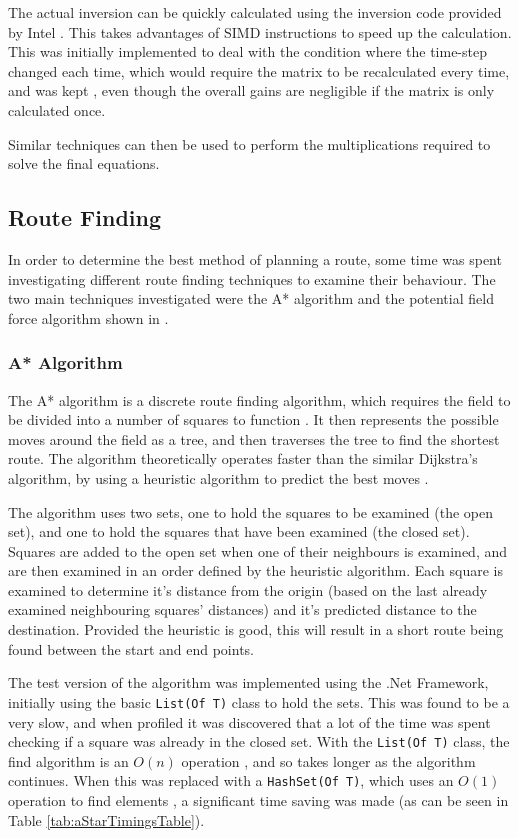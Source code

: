 \documentclass[10pt]{article}
\begin{document}
The actual inversion can be quickly calculated using the inversion code provided
by Intel \cite{intelMatrixInverse}.  This takes advantages of SIMD
instructions to speed up the calculation.  This was initially implemented to
deal with the condition where the time-step changed each time, which would
require the matrix to be recalculated every time, and was kept , even though the
overall gains are negligible if the matrix is only calculated once.

Similar techniques can then be used to perform the multiplications required to
solve the final equations.

\subsection{Route Finding}
In order to determine the best method of planning a route, some time was spent
investigating different route finding techniques to examine their behaviour. 
The two main techniques investigated were the A* algorithm and the potential
field force algorithm shown in \cite{intelligentAlgorithmPathPlanning}.

\subsubsection{A* Algorithm}

The A* algorithm is a discrete route finding algorithm, which requires the field
to be divided into a number of squares to function \cite{aiModernApproach}.  It
then represents the possible moves around the field as a tree, and then
traverses the tree to find the shortest route.  The algorithm theoretically
operates faster than the similar Dijkstra's algorithm, by using a heuristic
algorithm to predict the best moves \cite{wikipediaAStar}.

The algorithm uses two sets, one to hold the squares to be examined (the open
set), and one to hold the squares that have been examined (the closed set).
Squares are added to the open set when one of their neighbours is examined, and
are then examined in an order defined by the heuristic algorithm.  Each square
is examined to determine it's distance from the origin (based on the last
already examined neighbouring squares' distances) and it's predicted distance to
the destination. Provided the heuristic is good, this will result in a short
route being found between the start and end points.

The test version of the algorithm was implemented using the .Net Framework,
initially using the basic \texttt{List(Of T)} class to hold the sets.  This was
found to be a very slow, and when profiled it was discovered that a lot of the
time was spent checking if a square was already in the closed set.  With the
\texttt{List(Of T)} class, the find algorithm is an $O(n)$ operation
\cite{msdnListOfT}, and so takes longer as the algorithm continues.  When this
was replaced with a \texttt{HashSet(Of T)}, which uses an $O(1)$ operation to
find elements \cite{msdnHashSetOfT}, a significant time saving was made (as can
be seen in Table \ref{tab:aStarTimingsTable}).
\end{document}
